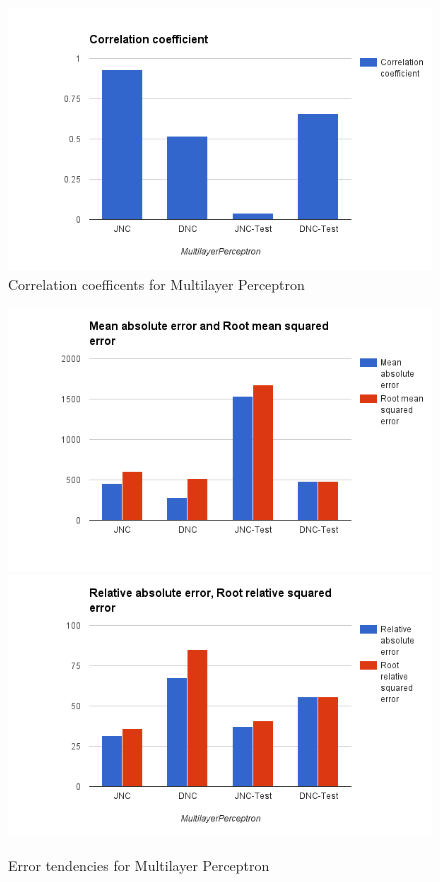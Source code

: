 \begin{figure}[h]
\centering
\includegraphics[scale=0.4]{figures/MP_1.png} 
\caption{Correlation coefficents for Multilayer Perceptron}
\label{fig:correl_mp}
\end{figure}

\begin{figure}[h]
\centering
\includegraphics[scale=0.4]{figures/MP_2.png} 
\includegraphics[scale=0.4]{figures/MP_3.png} 
\caption{Error tendencies for Multilayer Perceptron}
\label{fig:error_mp}
\end{figure}

